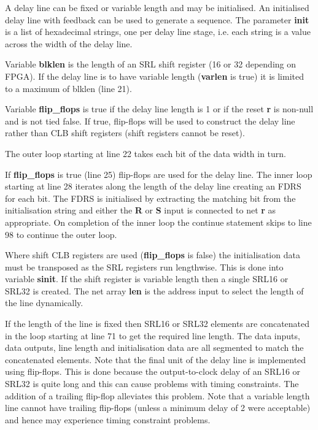     A delay line can be fixed or variable length and may be initialised.
    An initialised delay line with feedback can be used to generate a
    sequence. The parameter {\bf init} is a list of hexadecimal strings,
    one per delay line stage, i.e. each string is a value across the
    width of the delay line.

    Variable {\bf blklen} is the length of an SRL shift register (16 or
    32 depending on FPGA). If the delay line is to have variable length
    ({\bf varlen} is true) it is limited to a maximum of blklen (line
    21).

    Variable {\bf flip\_flops} is true if the delay line length is 1 or if
    the reset {\bf r} is non-null and is not tied false. If true, flip-flops
    will be used to construct the delay line rather than CLB shift registers
    (shift registers cannot be reset).

    The outer loop starting at line 22 takes each bit of the data width
    in turn.

    If {\bf flip\_flops} is true (line 25) flip-flops are used for the
    delay line. The inner loop starting at line 28 iterates along the
    length of the delay line creating an FDRS for each bit. The FDRS is
    initialised by extracting the matching bit from the initialisation
    string and either the {\bf R} or {\bf S} input is connected to net
    {\bf r} as appropriate. On completion of the inner loop the
    continue statement skips to line 98 to continue the outer loop.

    Where shift CLB registers are used ({\bf flip\_flops} is false)
    the initialisation data must be transposed as the SRL registers
    run lengthwise. This is done into variable {\bf sinit}. If the
    shift register is variable length then a single SRL16 or SRL32
    is created. The net array {\bf len} is the address input to select
    the length of the line dynamically.

    If the length of the line is fixed then SRL16 or SRL32 elements are
    concatenated in the loop starting at line 71 to get the required
    line length. The data inputs, data outputs, line length and
    initialisation data are all segmented to match the concatenated
    elements. Note that the final unit of the delay line is implemented
    using flip-flops. This is done because the output-to-clock delay of
    an SRL16 or SRL32 is quite long and this can cause problems with
    timing constraints. The addition of a trailing flip-flop alleviates
    this problem. Note that a variable length line cannot have trailing
    flip-flops (unless a minimum delay of 2 were acceptable) and hence
    may experience timing constraint problems.


